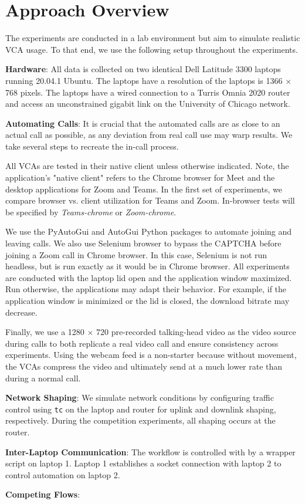 \section{Approach Overview}\label{sec:approach}

The experiments are conducted in a lab environment but aim to simulate realistic VCA usage. To that end, we use the following setup throughout the experiments.

\textbf{Hardware}: All data is collected on two identical Dell Latitude 3300 laptops running 20.04.1 Ubuntu. The laptops have a resolution of the laptops is 1366 $\times$ 768 pixels. The laptops have a wired connection to a Turris Omnia 2020 router and access an unconstrained gigabit link on the University of Chicago network. 

\textbf{Automating Calls}: It is crucial that the automated calls are as close to an actual call as possible, as any deviation from real call use may warp results. We take several steps to recreate the in-call process.

All VCAs are tested in their native client unless otherwise indicated. Note, the application's "native client" refers to the Chrome browser for Meet and the desktop applications for Zoom and Teams. In the first set of experiments, we compare browser vs. client utilization for Teams and Zoom. In-browser tests will be specified by \textit{Teams-chrome} or \textit{Zoom-chrome}. 

We use the PyAutoGui and AutoGui Python packages to automate joining and leaving calls. We also use Selenium browser to bypass the CAPTCHA before joining a Zoom call in Chrome browser. In this case, Selenium is not run headless, but is run exactly as it would be in Chrome browser. All experiments are conducted with the laptop lid open and the application window maximized. Run otherwise, the applications may adapt their behavior. For example, if the application window is minimized or the lid is closed, the download bitrate may decrease.

Finally, we use a 1280 $\times$ 720 pre-recorded talking-head video as the video source during calls to both replicate a real video call and ensure consistency across experiments. Using the webcam feed is a non-starter because without movement, the VCAs compress the video and ultimately send at a much lower rate than during a normal call. 

\textbf{Network Shaping}: We simulate network conditions by configuring traffic control using \texttt{tc} on the laptop and router for uplink and downlink shaping, respectively. During the competition experiments, all shaping occurs at the router.

\textbf{Inter-Laptop Communication}: The workflow is controlled with by a wrapper script on laptop 1. Laptop 1 establishes a socket connection with laptop 2 to control automation on laptop 2.

\textbf{Competing Flows}: 
